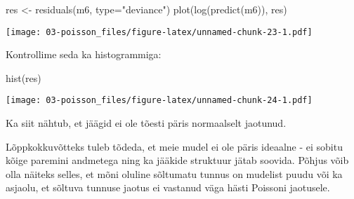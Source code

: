 \documentclass[
]{book}
\newenvironment{Shaded}{\begin{snugshade}}{\end{snugshade}}
\newcommand{\AttributeTok}[1]{\textcolor[rgb]{0.77,0.63,0.00}{#1}}
\newcommand{\FunctionTok}[1]{\textcolor[rgb]{0.00,0.00,0.00}{#1}}
\newcommand{\NormalTok}[1]{#1}
\newcommand{\OtherTok}[1]{\textcolor[rgb]{0.56,0.35,0.01}{#1}}
\newcommand{\StringTok}[1]{\textcolor[rgb]{0.31,0.60,0.02}{#1}}
\begin{document}
\begin{Shaded}
\begin{Highlighting}[]
\NormalTok{res }\OtherTok{\textless{}{-}} \FunctionTok{residuals}\NormalTok{(m6, }\AttributeTok{type=}\StringTok{"deviance"}\NormalTok{)}
\FunctionTok{plot}\NormalTok{(}\FunctionTok{log}\NormalTok{(}\FunctionTok{predict}\NormalTok{(m6)), res)}
\end{Highlighting}
\end{Shaded}

\texttt{[image: 03-poisson\_files/figure-latex/unnamed-chunk-23-1.pdf]}

Kontrollime seda ka histogrammiga:

\begin{Shaded}
\begin{Highlighting}[]
\FunctionTok{hist}\NormalTok{(res)}
\end{Highlighting}
\end{Shaded}

\texttt{[image: 03-poisson\_files/figure-latex/unnamed-chunk-24-1.pdf]}

Ka siit nähtub, et jäägid ei ole tõesti päris normaalselt jaotunud.

Lõppkokkuvõtteks tuleb tõdeda, et meie mudel ei ole päris ideaalne - ei sobitu kõige paremini andmetega ning ka jääkide struktuur jätab soovida. Põhjus võib olla näiteks selles, et mõni oluline sõltumatu tunnus on mudelist puudu või ka asjaolu, et sõltuva tunnuse jaotus ei vastanud väga hästi Poissoni jaotusele.

  
\end{document}
